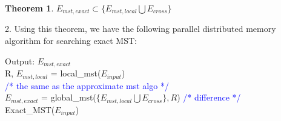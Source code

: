 \documentclass[12pt]{article}
\newtheorem{theorem}{Theorem}[section]
\begin{document}
\begin{appendices}
\begin{theorem}
\label{exact_mst}
$E_{mst,exact}\subset \{ E_{mst,local} \bigcup E_{cross}\}$ 
\end{theorem}

2. Using this theorem, we have the following parallel distributed memory algorithm for searching exact MST:
\begin{algorithm}[!h]
	\DontPrintSemicolon
    Output: $E_{mst,exact}$  \\
        \nl R, $E_{mst,local}$ = local\_mst($E_{input}$)\\ \quad \textcolor{blue}{/*  the same as the approximate mst algo */}\\
        \nl $E_{mst,exact}$ = global\_mst($\{ E_{mst,local} \bigcup E_{cross}\}, R$) \qquad \qquad\textcolor{blue}{/*  difference */}\\
	\caption{Exact\_MST($E_{input}$)}
	\label{exactmst}
\end{algorithm}

\end{appendices}
\end{document}
